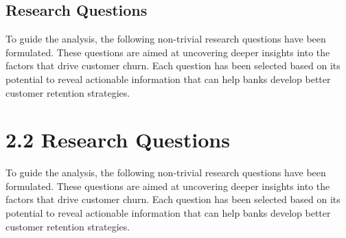 \documentclass[12pt]{article}
\begin{document}
\subsection{Research Questions}
To guide the analysis, the following non-trivial research questions have been formulated. These questions are aimed at uncovering deeper insights into the factors that drive customer churn. Each question has been selected based on its potential to reveal actionable information that can help banks develop better customer retention strategies.

\section{2.2 Research Questions}
To guide the analysis, the following non-trivial research questions have been formulated. These questions are aimed at uncovering deeper insights into the factors that drive customer churn. Each question has been selected based on its potential to reveal actionable information that can help banks develop better customer retention strategies.
\end{document}
